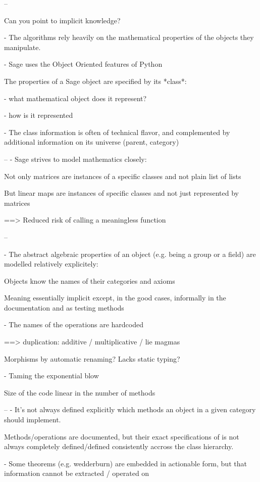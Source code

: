 \documentclass{deliverablereport}
\begin{document}
--

 Can you point to implicit knowledge?

- The algorithms rely heavily on the mathematical properties of
  the objects they manipulate.

- Sage uses the Object Oriented features of Python

  The properties of a Sage object are specified by its *class*:

  - what mathematical object does it represent?

  - how is it represented

- The class information is often of technical flavor, and complemented
  by additional information on its universe (parent, category)

--
- Sage strives to model mathematics closely:

  Not only matrices are instances of a specific classes and not plain
  list of lists

  But linear maps are instances of specific classes and not just
  represented by matrices

  ==> Reduced risk of calling a meaningless function

--

- The abstract algebraic properties of an object (e.g. being a group
  or a field) are modelled relatively explicitely:

  Objects know the names of their categories and axioms

  Meaning essentially implicit except, in the good cases, informally
  in the documentation and as testing methods

- The names of the operations are hardcoded

  ==> duplication: additive / multiplicative / lie magmas

  Morphisms by automatic renaming? Lacks static typing?

- Taming the exponential blow

  Size of the code linear in the number of methods

--
- It's not always defined explicitly which methods an object in a
  given category should implement.

  Methods/operations are documented, but their exact specifications of
  is not always completely defined/defined consistently accross the
  class hierarchy.

- Some theorems (e.g. wedderburn) are embedded in actionable form,
  but that information cannot be extracted / operated on
\end{document}
